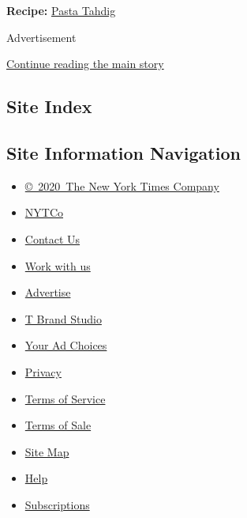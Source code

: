 \textbf{Recipe:}
\href{https://cooking.nytimes3xbfgragh.onion/recipes/1019328-pasta-tahdig}{Pasta
Tahdig}

Advertisement

\protect\hyperlink{after-bottom}{Continue reading the main story}

\hypertarget{site-index}{%
\subsection{Site Index}\label{site-index}}

\hypertarget{site-information-navigation}{%
\subsection{Site Information
Navigation}\label{site-information-navigation}}

\begin{itemize}
\tightlist
\item
  \href{https://help.nytimes3xbfgragh.onion/hc/en-us/articles/115014792127-Copyright-notice}{©~2020~The
  New York Times Company}
\end{itemize}

\begin{itemize}
\tightlist
\item
  \href{https://www.nytco.com/}{NYTCo}
\item
  \href{https://help.nytimes3xbfgragh.onion/hc/en-us/articles/115015385887-Contact-Us}{Contact
  Us}
\item
  \href{https://www.nytco.com/careers/}{Work with us}
\item
  \href{https://nytmediakit.com/}{Advertise}
\item
  \href{http://www.tbrandstudio.com/}{T Brand Studio}
\item
  \href{https://www.nytimes3xbfgragh.onion/privacy/cookie-policy\#how-do-i-manage-trackers}{Your
  Ad Choices}
\item
  \href{https://www.nytimes3xbfgragh.onion/privacy}{Privacy}
\item
  \href{https://help.nytimes3xbfgragh.onion/hc/en-us/articles/115014893428-Terms-of-service}{Terms
  of Service}
\item
  \href{https://help.nytimes3xbfgragh.onion/hc/en-us/articles/115014893968-Terms-of-sale}{Terms
  of Sale}
\item
  \href{https://spiderbites.nytimes3xbfgragh.onion}{Site Map}
\item
  \href{https://help.nytimes3xbfgragh.onion/hc/en-us}{Help}
\item
  \href{https://www.nytimes3xbfgragh.onion/subscription?campaignId=37WXW}{Subscriptions}
\end{itemize}
